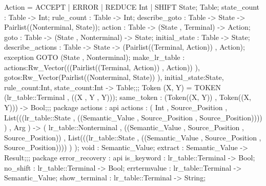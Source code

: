 {{{{                                        Action  = ACCEPT | ERROR | REDUCE Int | SHIFT State;
                                        Table;
                                        state_count : Table -> Int;
                                        rule_count : Table -> Int;
                                        describe_goto : Table -> State -> Pairlist((Nonterminal, State));
                                        action : Table -> (State , Terminal) -> Action;
                                        goto : Table -> (State , Nonterminal) -> State;
                                        initial_state : Table -> State;
                                        describe_actions : Table -> State -> (Pairlist((Terminal, Action)) , Action);
                                        exception GOTO (State , Nonterminal);
                                            make_lr_table :
                                                    {actions:Rw_Vector(((Pairlist((Terminal, Action)) , Action)) ),
                                                    gotos:Rw_Vector(Pairlist((Nonterminal, State)) ), initial_state:State, rule_count:Int,
                                                    state_count:Int}
                                                ->
                                                Table;};;
                            Token (X, Y) = TOKEN (lr_table::Terminal , ((X , Y , Y)));
                            same_token : (Token((X, Y)) , Token((X, Y))) -> Bool;};;
                    package actions
                      : api {   actions :
                                    (   Int , Source_Position ,
                                        List(((lr_table::State , ((Semantic_Value , Source_Position , Source_Position)))) ) , Arg
                                    )
                                    ->
                                    (   lr_table::Nonterminal , ((Semantic_Value , Source_Position , Source_Position)) ,
                                        List(((lr_table::State , ((Semantic_Value , Source_Position , Source_Position)))) )
                                    );
                            void : Semantic_Value;
                            extract : Semantic_Value -> Result;};;
                    package error_recovery
                      : api {
                            is_keyword : lr_table::Terminal -> Bool;
                            no_shift : lr_table::Terminal -> Bool;
                            errtermvalue : lr_table::Terminal -> Semantic_Value;
                            show_terminal : lr_table::Terminal -> String;
}}}
